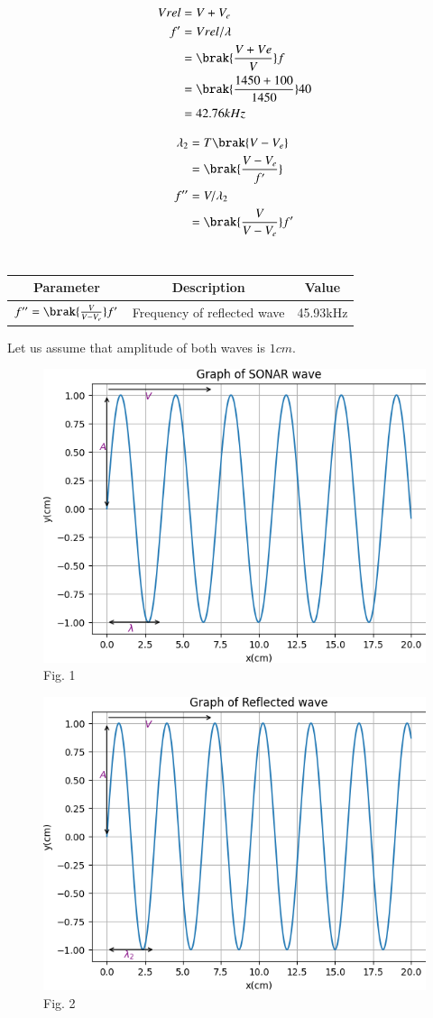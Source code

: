 \documentclass[journal,12pt,onecolumn]{IEEEtran}
\theoremstyle{remark}
\begin{document}
\begin{align}
Vrel&=V+V_e\\
f'&=Vrel/\lambda\\
&=\brak{\frac{V+Ve}{V}}f\\
&= \brak{\frac{1450+100}{1450}}40\\
&=42.76kHz
\end{align}

\begin{align}
\lambda_2&=T\brak{V-V_e}\\
&=\brak{\frac{V-V_e}{f'}}\\
f''&=V/\lambda_2\\
&=\brak{\frac{V}{V-V_e}}f'
\end{align}
\\
\begin{tabular}{|c|c|c|}
   \hline
   Parameter & Description & Value\\
   \hline
   $f''= \brak{\frac{V}{V-V_e}}f'$& Frequency of reflected wave & 45.93kHz\\
   \hline
   
\end{tabular}
\newpage
Let us assume that amplitude of both waves is $1cm$.

\begin{figure}[h]
   
    \includegraphics[width=120mm]{figs/fig1.png}\\
     \centering
    {Fig. 1}
  
\end{figure}

\begin{figure}[h]
    
    \includegraphics[width=120mm]{figs/fig2.png}\\
     \centering
    {Fig. 2}
\end{figure}
\end{document}
